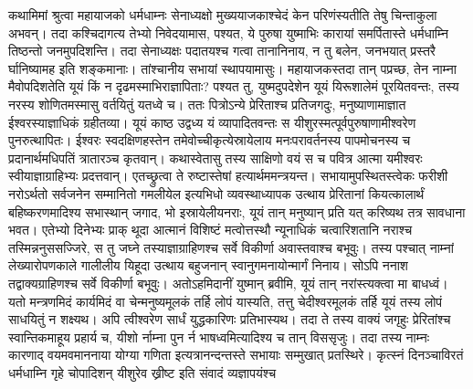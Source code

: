 \vakya कथामिमां श्रुत्वा महायाजको धर्मधाम्नः सेनाध्यक्षो मुख्ययाजकाश्चेदं केन परिणंस्यतीति तेषु चिन्ताकुला अभवन्।
\vakya तदा कश्चिदागत्य तेभ्यो निवेदयामास, पश्यत, ये पुरुषा युष्माभिः कारायां समर्पितास्ते धर्मधाम्नि तिष्ठन्तो जनमुपदिशन्ति।
\vakya तदा सेनाध्यक्षः पदातयश्च गत्वा तानानिनाय, न तु बलेन, जनभयात् प्रस्तरै र्घानिष्यामह इति शङ्कमानाः।
\vakya तांश्चानीय सभायां स्थापयामासुः।
\vakya महायाजकस्तदा तान् पप्रच्छ, तेन नाम्ना मैवोपदिशतेति यूयं किं न दृढमस्माभिराज्ञापिताः? पश्यत तु, युष्मदुपदेशेन यूयं यिरूशालेमं पूरयितवन्तः, तस्य नरस्य शोणितमस्मासु वर्तयितुं यतध्वे च।
\vakya ततः पित्रोऽन्ये प्रेरिताश्च प्रतिजगदुः, मनुष्याणामाज्ञात ईश्वरस्याज्ञाधिकं ग्रहीतव्या।
\vakya यूयं काष्ठ उद्वध्य यं व्यापादितवन्तः स यीशुरस्मत्पूर्वपुरुषाणामीश्वरेण पुनरुत्थापितः।
\vakya ईश्वरः स्वदक्षिणहस्तेन तमेवोच्चीकृत्येस्रायेलाय मनःपरावर्तनस्य पापमोचनस्य च प्रदानार्थमधिपतिं त्रातारञ्च कृतवान्।
\vakya कथास्वेतासु तस्य साक्षिणो वयं स च पवित्र आत्मा यमीश्वरः स्वीयाज्ञाग्राहिभ्यः प्रदत्तवान्।
\vakya एतच्छ्रुत्वा ते रुष्टास्तेषां हत्यार्थममन्त्रयन्त।
\vakya सभायामुपस्थितस्त्वेकः फरीशी नरोऽर्थतो सर्वजनेन सम्मानितो गमलीयेल इत्यभिधो व्यवस्थाध्यापक उत्थाय प्रेरितानां कियत्कालार्थं बहिष्करणमादिश्य सभास्थान् जगाद,
\vakya भो इस्रायेलीयनराः, यूयं तान् मनुष्यान् प्रति यत् करिष्यथ तत्र सावधाना भवत।
\vakya एतेभ्यो दिनेभ्यः प्राक् थूदा आत्मानं विशिष्टं मत्वोत्तस्थौ न्यूनाधिकं चत्वारिशतानि नराश्च तस्मिन्ननुससज्जिरे, स तु जघ्ने तस्याज्ञाग्राहिणश्च सर्वे विकीर्णा अवास्तवाश्च बभूवुः।
\vakya तस्य पश्चात् नाम्नां लेख्यारोपणकाले गालीलीय यिहूदा उत्थाय बहुजनान् स्वानुगमनायोन्मार्गं निनाय। सोऽपि ननाश तद्वाक्यग्राहिणश्च सर्वे विकीर्णा बभूवुः।
\vakya अतोऽहमिदानीं युष्मान् ब्रवीमि, यूयं तान् नरांस्त्यक्त्वा मा बाधध्वं।
\vakya यतो मन्त्रणमिदं कार्यमिदं वा चेन्मनुष्यमूलकं तर्हि लोपं यास्यति, तत्तु चेदीश्वरमूलकं तर्हि यूयं तस्य लोपं साधयितुं न शक्ष्यथ। अपि त्वीश्वरेण सार्धं युद्धकारिणः प्रतिभास्यथ।
\vakya तदा ते तस्य वाक्यं जगृहुः प्रेरितांश्च स्वान्तिकमाहूय प्रहार्य च, यीशो र्नाम्ना पुन र्न भाषध्वमित्यादिश्य च तान् विससृजुः।
\vakya तदा तस्य नाम्नः कारणाद् वयमवमाननाया योग्या गणिता इत्यत्रानन्दन्तस्ते सभायाः सम्मुखात् प्रतस्थिरे।
\vakya कृत्स्नं दिनञ्चाविरतं धर्मधाम्नि गृहे चोपादिशन् यीशुरेव ख्रीष्ट इति संवादं व्यज्ञापयंश्च\eoc